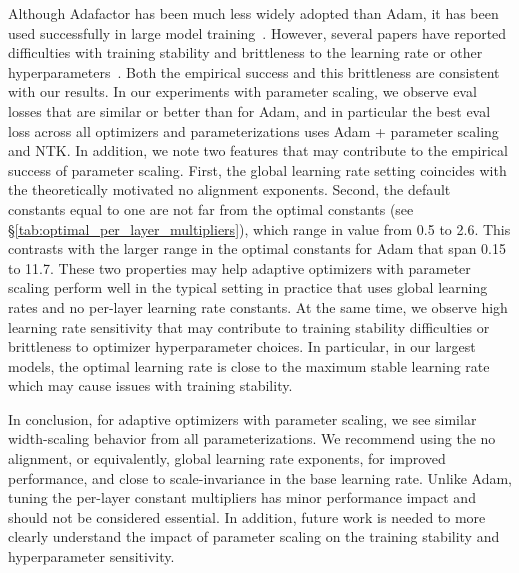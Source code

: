 \documentclass{article}
\newcommand{\sref}[1]{\S\ref{#1}}
\theoremstyle{plain}
\theoremstyle{definition}
\theoremstyle{remark}
\begin{document}
Although Adafactor has been much less widely adopted than Adam, it has been used successfully in large model training~\citep{t5,chowdhery2023palm,du2022glam,fedus2022switch,zoph2022st}. However, several papers have reported difficulties with training stability and brittleness to the learning rate or other hyperparameters~\citep{rae2021scaling,zhai2021scaling}. Both the empirical success and this brittleness are consistent with our results. In our experiments with parameter scaling, we observe eval losses that are similar or better than for Adam, and in particular the best eval loss across all optimizers and parameterizations uses Adam + parameter scaling and NTK. In addition, we note two features that may contribute to the empirical success of parameter scaling. First, the global learning rate setting coincides with the theoretically motivated no alignment exponents. Second, the default constants equal to one are not far from the optimal constants (see \sref{tab:optimal_per_layer_multipliers}), which range in value from 0.5 to 2.6. This contrasts with the larger range in the optimal constants for Adam that span 0.15 to 11.7. These two properties may help adaptive optimizers with parameter scaling perform well in the typical setting in practice that uses global learning rates and no per-layer learning rate constants. At the same time, we observe high learning rate sensitivity that may contribute to training stability difficulties or brittleness to optimizer hyperparameter choices. In particular, in our largest models, the optimal learning rate is close to the maximum stable learning rate which may cause issues with training stability.

In conclusion, for adaptive optimizers with parameter scaling, we see similar width-scaling behavior from all parameterizations. We recommend using the no alignment, or equivalently, global learning rate exponents, for improved performance, and close to scale-invariance in the base learning rate. Unlike Adam, tuning the per-layer constant multipliers has minor performance impact and should not be considered essential. In addition, future work is needed to more clearly understand the impact of parameter scaling on the training stability and hyperparameter sensitivity.
\end{document}
